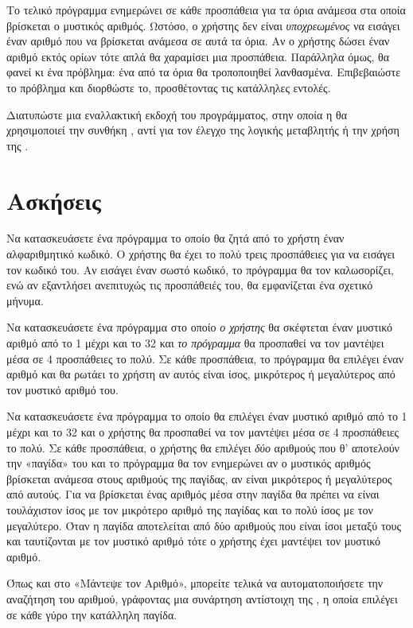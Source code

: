 \documentclass[a4paper,11pt,oneside]{book}
\begin{document}
\begin{exercise}
Το τελικό πρόγραμμα ενημερώνει σε κάθε προσπάθεια για τα όρια ανάμεσα στα οποία βρίσκεται ο μυστικός αριθμός. Ωστόσο, ο χρήστης δεν είναι \emph{υποχρεωμένος} να εισάγει έναν αριθμό που να βρίσκεται ανάμεσα σε αυτά τα όρια. Αν ο χρήστης δώσει έναν αριθμό εκτός ορίων τότε απλά θα χαραμίσει μια προσπάθεια. Παράλληλα όμως, θα φανεί κι ένα πρόβλημα: ένα από τα όρια θα τροποποιηθεί λανθασμένα. Επιβεβαιώστε το πρόβλημα και διορθώστε το, προσθέτοντας τις κατάλληλες εντολές.
\end{exercise}

\begin{exercise}
Διατυπώστε μια εναλλακτική εκδοχή του προγράμματος, στην οποία η  θα χρησιμοποιεί την συνθήκη , αντί για τον έλεγχο της λογικής μεταβλητής  ή την χρήση της .
\end{exercise}

\section{Ασκήσεις}

\begin{exercise}
Να κατασκευάσετε ένα πρόγραμμα το οποίο θα ζητά από το χρήστη έναν αλφαριθμητικό κωδικό. Ο χρήστης θα έχει το πολύ τρεις προσπάθειες για να εισάγει τον κωδικό του. Αν εισάγει έναν σωστό κωδικό, το πρόγραμμα θα τον καλωσορίζει, ενώ αν εξαντλήσει ανεπιτυχώς τις προσπάθειές του, θα εμφανίζεται ένα σχετικό μήνυμα. 
\end{exercise}

\begin{exercise}
Να κατασκευάσετε ένα πρόγραμμα στο οποίο \emph{ο χρήστης} θα σκέφτεται έναν μυστικό αριθμό από το 1 μέχρι και το 32 και \emph{το πρόγραμμα} θα προσπαθεί να τον μαντέψει μέσα σε 4 προσπάθειες το πολύ. Σε κάθε προσπάθεια, το πρόγραμμα θα επιλέγει έναν αριθμό και θα ρωτάει το χρήστη αν αυτός είναι ίσος, μικρότερος ή μεγαλύτερος από τον μυστικό αριθμό του.
\end{exercise}

\begin{exercise}
Να κατασκευάσετε ένα πρόγραμμα το οποίο θα επιλέγει έναν μυστικό αριθμό από το 1 μέχρι και το 32 και ο χρήστης θα προσπαθεί να τον μαντέψει μέσα σε 4 προσπάθειες το πολύ. Σε κάθε προσπάθεια, ο χρήστης θα επιλέγει \emph{δύο} αριθμούς που θ' αποτελούν την «παγίδα» του και το πρόγραμμα θα τον ενημερώνει αν ο μυστικός αριθμός βρίσκεται ανάμεσα στους αριθμούς της παγίδας, αν είναι μικρότερος ή μεγαλύτερος από αυτούς. Για να βρίσκεται ένας αριθμός μέσα στην παγίδα θα πρέπει να είναι τουλάχιστον ίσος με τον μικρότερο αριθμό της παγίδας και το πολύ ίσος με τον μεγαλύτερο.
Όταν η παγίδα αποτελείται από δύο αριθμούς που είναι ίσοι μεταξύ τους και ταυτίζονται με τον μυστικό αριθμό τότε ο χρήστης έχει μαντέψει τον μυστικό αριθμό. 

Όπως και στο «Μάντεψε τον Αριθμό», μπορείτε τελικά να αυτοματοποιήσετε την αναζήτηση του αριθμού, γράφοντας μια συνάρτηση αντίστοιχη της , η οποία επιλέγει σε κάθε γύρο την κατάλληλη παγίδα.
\end{exercise}
\end{document}
